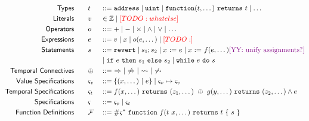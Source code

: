   \begin{alignat*}{3}
    \Typ{Types}      \qquad & t && ::=
      \Keywd{address} \mid
      \Keywd{uint} \mid
      \Keywd{function}(t, \dots)~\Keywd{returns}~t \mid
      \dots \\
    \Typ{Literals}    \qquad & v && \in
      \mathbb{Z} \mid
      \todo{whatelse} \\
    \Typ{Operators} \qquad & o && ::=
      + \mid
      - \mid
      \times \mid
      \land \mid
      \lor \mid
      \dots \\
    \Typ{Expressions}\qquad & e && ::=
      v \mid
      x \mid
      o(e, \dots) \mid
      \todo{} \\
    \Typ{Statements} \qquad & s && ::=
                                   \Keywd{revert} \mid
                                   s_1; s_2 \mid
                                   x ~\mathsf{:=}~ e \mid
                                   x ~\mathsf{:=}~ f(e, \dots)  \text{\yy{unify assignments?}}\\
                            & && \mid \Keywd{if}~e~\Keywd{then}~s_1~\Keywd{else}~s_2 \mid
                                   \Keywd{while}~e~\Keywd{do}~s
                                   \\
    \Typ{Temporal~Connectives} \qquad & \oplus && ::=
      ~ \Rightarrow ~\mid~ \not\Rightarrow ~\mid~ \leadsto ~\mid~ \not\leadsto \\
    \Typ{Value~Specifications} \qquad & \varsigma_v && ::=
      \{ (x, \dots) ~\vert~ e \} \mid
      \varsigma_v \mapsto \varsigma_v \\
    \Typ{Temporal~Specifications} \qquad & \varsigma_t && ::=
     f(x, \dots)~\Keywd{returns}~ (z_1, \dots) ~\oplus~ g(y, \dots)~\Keywd{returns}~ (z_2, \dots) \land e \\
    \Typ{Specifications} \qquad & \varsigma && ::= \varsigma_v \mid \varsigma_t \\
    \Typ{Function~Definitions} \qquad & \mathcal{F} && ::=
      \# \varsigma^* ~ \Keywd{function}~f(t ~ x, \dots)~\Keywd{returns}~t~\{ ~s~ \}
  \end{alignat*}

\fi
